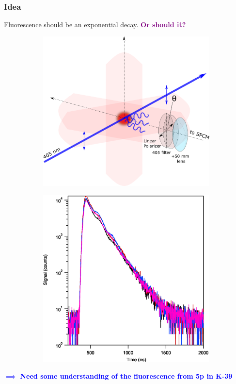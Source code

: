\documentclass{beamer}
\theoremstyle{definition}
\begin{document}
\begin{frame}
\frametitle{Idea}
Fluorescence should be an exponential decay. 
\textcolor{purple}{\textbf{Or should it?}}

\begin{figure}[!htb]
	\vspace{-10pt}
	\centering
	\begin{subfigure}{0.55\textwidth}
		\includegraphics[width=\textwidth]{experimental_geometry}
	\end{subfigure}
	\begin{subfigure}{0.4\textwidth}
		\includegraphics[width=\textwidth]{big_beats.eps}
	\end{subfigure}
\end{figure}

\textbf{\textcolor{blue}{$\implies$ Need some understanding of the fluorescence from 5p in K-39}}

\end{frame}
\end{document}

